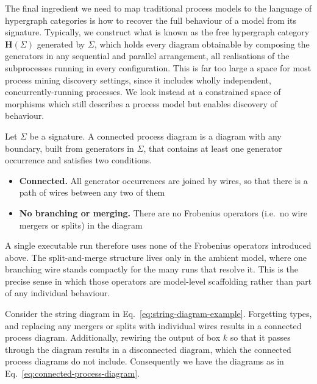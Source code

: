 The final ingredient we need to map traditional process models to the language of hypergraph categories is how to recover the full behaviour of a model from its signature. Typically, we construct what is known as the free hypergraph category $\mathbf{H}(\Sigma)$ generated by $\Sigma$, which holds every diagram obtainable by composing the generators in any sequential and parallel arrangement, all realisations of the subprocesses running in every configuration. This is far too large a space for most process mining discovery settings, since it includes wholly independent, concurrently-running processes. We look instead at a constrained space of morphisms which still describes a process model but enables discovery of behaviour.
\begin{definition}
Let $\Sigma$ be a signature. A connected process diagram is a diagram with any boundary, built from generators in $\Sigma$,
that contains at least one generator occurrence and satisfies two conditions.
\begin{itemize}
\item \textbf{Connected.} All generator occurrences are joined by wires, so that there is a path of wires between any two of them
\item \textbf{No branching or merging.} There are no Frobenius operators (i.e.\ no wire mergers or splits) in the diagram
\end{itemize}
\end{definition}
A single executable run therefore uses none of the Frobenius operators introduced
above. The split-and-merge structure lives only in the ambient model, where one
branching wire stands compactly for the many runs that resolve it. This is the
precise sense in which those operators are model-level scaffolding rather than part
of any individual behaviour.
\begin{exmp}
Consider the string diagram in Eq.~\ref{eq:string-diagram-example}. Forgetting types, and replacing any mergers or splits with individual wires results in a connected process diagram. Additionally, rewiring the output of box $k$ so that it passes through the diagram results in a disconnected diagram, which the connected process diagrams do not include. Consequently we have the diagrams as in Eq.~\ref{eq:connected-process-diagram}.
\begin{strip}
\begin{align}\label{eq:connected-process-diagram}
\vcenter{\hbox{\unskip}}
\hspace{1cm}
\vcenter{\hbox{\unskip}}
\end{align}
\end{strip}
\end{exmp}
